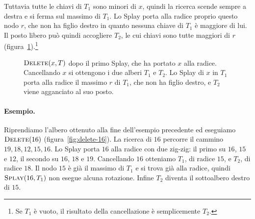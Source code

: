 Tuttavia tutte le chiavi di $T_1$ sono minori di $x$, quindi la ricerca scende sempre a destra e si ferma sul massimo di $T_1$. Lo Splay porta alla radice proprio questo nodo $r$, che non ha figlio destro in quanto nessuna chiave di $T_1$ è maggiore di lui. Il posto libero può quindi accogliere $T_2$, le cui chiavi sono tutte maggiori di $r$ (figura~\ref{fig:delete}).\footnote{Se $T_1$ è vuoto, il risultato della cancellazione è semplicemente $T_2$.}

\begin{figure}[htbp]
\centering
{}
\caption{$\textsc{Delete}(x,T)$ dopo il primo Splay, che ha portato $x$ alla radice. Cancellando $x$ si ottengono i due alberi $T_1$ e $T_2$. Lo Splay di $x$ in $T_1$ porta alla radice il massimo $r$ di $T_1$, che non ha figlio destro, e $T_2$ viene agganciato al suo posto.}
\label{fig:delete}
\end{figure}

\paragraph{Esempio.}
Riprendiamo l'albero ottenuto alla fine dell'esempio precedente ed eseguiamo $\textsc{Delete}(16)$ (figura~\ref{fig:delete-16}). La ricerca di $16$ percorre il cammino $19, 18, 12, 15, 16$. Lo Splay porta $16$ alla radice con due zig-zig: il primo su $16$, $15$ e $12$, il secondo su $16$, $18$ e $19$. Cancellando $16$ otteniamo $T_1$, di radice $15$, e $T_2$, di radice $18$. Il nodo $15$ è già il massimo di $T_1$ e si trova già alla radice, quindi $\textsc{Splay}(16,T_1)$ non esegue alcuna rotazione. Infine $T_2$ diventa il sottoalbero destro di $15$.

